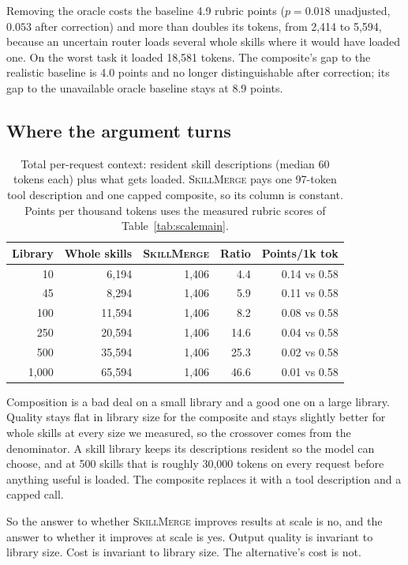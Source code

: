 \documentclass[11pt]{article}
\newcommand{\sm}{\textsc{SkillMerge}}
\begin{document}
Removing the oracle costs the baseline 4.9 rubric points ($p = 0.018$ unadjusted, $0.053$ after
correction) and more than doubles its tokens, from 2,414 to 5,594, because an uncertain router loads
several whole skills where it would have loaded one. On the worst task it loaded 18,581 tokens. The
composite's gap to the realistic baseline is 4.0 points and no longer distinguishable after
correction; its gap to the unavailable oracle baseline stays at 8.9 points.

\subsection{Where the argument turns}

\begin{table}[t]\centering\small
\begin{tabular}{rrrrr}
\toprule
Library & Whole skills & \sm{} & Ratio & Points/1k tok \\
\midrule
10 & 6{,}194 & 1{,}406 & 4.4 & 0.14 vs 0.58 \\
45 & 8{,}294 & 1{,}406 & 5.9 & 0.11 vs 0.58 \\
100 & 11{,}594 & 1{,}406 & 8.2 & 0.08 vs 0.58 \\
250 & 20{,}594 & 1{,}406 & 14.6 & 0.04 vs 0.58 \\
500 & 35{,}594 & 1{,}406 & 25.3 & 0.02 vs 0.58 \\
1{,}000 & 65{,}594 & 1{,}406 & 46.6 & 0.01 vs 0.58 \\
\bottomrule
\end{tabular}
\caption{Total per-request context: resident skill descriptions (median 60 tokens each) plus what
gets loaded. \sm{} pays one 97-token tool description and one capped composite, so its column is
constant. Points per thousand tokens uses the measured rubric scores of
Table~\ref{tab:scalemain}.}
\label{tab:scalecost}
\end{table}

Composition is a bad deal on a small library and a good one on a large library. Quality stays flat
in library size for the composite and stays slightly better for whole skills at every size we
measured, so the crossover comes from the denominator. A skill library keeps its descriptions
resident so the model can choose, and at 500 skills that is roughly 30,000 tokens on every request
before anything useful is loaded. The composite replaces it with a tool description and a capped
call.

So the answer to whether \sm{} improves results at scale is no, and the answer to whether it
improves at scale is yes. Output quality is invariant to library size. Cost is invariant to library
size. The alternative's cost is not.
\end{document}
